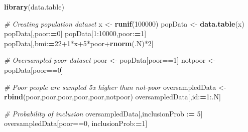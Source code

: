 \documentclass[]{book}
\newenvironment{Shaded}{\begin{snugshade}}{\end{snugshade}}
\newcommand{\KeywordTok}[1]{\textcolor[rgb]{0.13,0.29,0.53}{\textbf{{#1}}}}
\newcommand{\DecValTok}[1]{\textcolor[rgb]{0.00,0.00,0.81}{{#1}}}
\newcommand{\StringTok}[1]{\textcolor[rgb]{0.31,0.60,0.02}{{#1}}}
\newcommand{\CommentTok}[1]{\textcolor[rgb]{0.56,0.35,0.01}{\textit{{#1}}}}
\newcommand{\ErrorTok}[1]{\textcolor[rgb]{0.64,0.00,0.00}{\textbf{{#1}}}}
\newcommand{\NormalTok}[1]{{#1}}
\theoremstyle{definition}
\theoremstyle{definition}
\theoremstyle{remark}
\begin{document}
\begin{Shaded}
\begin{Highlighting}[]
\KeywordTok{library}\NormalTok{(data.table)}

\CommentTok{# Creating population dataset}
\NormalTok{x <-}\StringTok{ }\KeywordTok{runif}\NormalTok{(}\DecValTok{100000}\NormalTok{)}
\NormalTok{popData <-}\StringTok{ }\KeywordTok{data.table}\NormalTok{(x)}
\NormalTok{popData[,poor:}\ErrorTok{=}\DecValTok{0}\NormalTok{]}
\NormalTok{popData[}\DecValTok{1}\NormalTok{:}\DecValTok{10000}\NormalTok{,poor:}\ErrorTok{=}\DecValTok{1}\NormalTok{]}
\NormalTok{popData[,bmi:}\ErrorTok{=}\DecValTok{22+1}\NormalTok{*x}\DecValTok{+5}\NormalTok{*poor+}\KeywordTok{rnorm}\NormalTok{(.N)*}\DecValTok{2}\NormalTok{]}

\CommentTok{# Oversampled poor dataset}
\NormalTok{poor <-}\StringTok{ }\NormalTok{popData[poor==}\DecValTok{1}\NormalTok{]}
\NormalTok{notpoor <-}\StringTok{ }\NormalTok{popData[poor==}\DecValTok{0}\NormalTok{]}

\CommentTok{# Poor people are sampled 5x higher than not-poor}
\NormalTok{oversampledData <-}\StringTok{ }\KeywordTok{rbind}\NormalTok{(poor,poor,poor,poor,poor,notpoor)}
\NormalTok{oversampledData[,id:}\ErrorTok{=}\DecValTok{1}\NormalTok{:.N]}

\CommentTok{# Probability of inclusion}
\NormalTok{oversampledData[,inclusionProb :}\ErrorTok{=}\StringTok{ }\DecValTok{5}\NormalTok{]}
\NormalTok{oversampledData[poor==}\DecValTok{0}\NormalTok{, inclusionProb:}\ErrorTok{=}\DecValTok{1}\NormalTok{]}
\end{Highlighting}
\end{Shaded}
\end{document}
